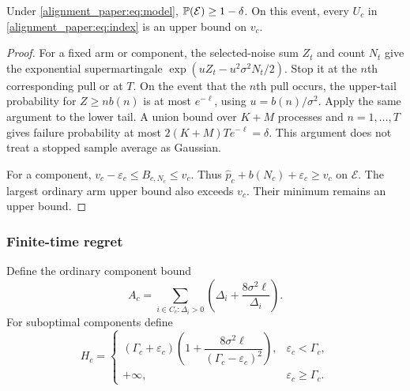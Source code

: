 \begin{lemma}
Under \eqref{alignment_paper:eq:model}, $\mathbb P(\mathcal E)\ge1-\delta$. On this event, every $U_c$ in \eqref{alignment_paper:eq:index} is an upper bound on $v_c$.
\label{alignment_paper:lem:confidence}
\end{lemma}
\begin{proof}
For a fixed arm or component, the selected-noise sum $Z_t$ and count $N_t$ give the exponential supermartingale
$\exp(uZ_t-u^2\sigma^2N_t/2)$. Stop it at the $n$th corresponding pull or at $T$. On the event that the $n$th pull occurs, the upper-tail probability for $Z\ge nb(n)$ is at most $e^{-\ell}$, using $u=b(n)/\sigma^2$. Apply the same argument to the lower tail. A union bound over $K+M$ processes and $n=1,\ldots,T$ gives failure probability at most $2(K+M)Te^{-\ell}=\delta$. This argument does not treat a stopped sample average as Gaussian.

For a component, $v_c-\varepsilon_c\le B_{c,N_c}\le v_c$. Thus $\widehat p_c+b(N_c)+\varepsilon_c\ge v_c$ on $\mathcal E$. The largest ordinary arm upper bound also exceeds $v_c$. Their minimum remains an upper bound.
\end{proof}

\subsubsection{Finite-time regret}
Define the ordinary component bound
\begin{equation}
 A_c=\sum_{i\in C_c:\Delta_i>0}
        \left(\Delta_i+\frac{8\sigma^2\ell}{\Delta_i}\right).
 \label{alignment_paper:eq:Ac}
\end{equation}
For suboptimal components define
\begin{equation}
 H_c=\begin{cases}
 (\Gamma_c+\varepsilon_c)
 \left(1+\dfrac{8\sigma^2\ell}{(\Gamma_c-\varepsilon_c)^2}\right),
       &\varepsilon_c<\Gamma_c,\\
 +\infty,&\varepsilon_c\ge\Gamma_c.
 \end{cases}
 \label{alignment_paper:eq:Hc}
\end{equation}

